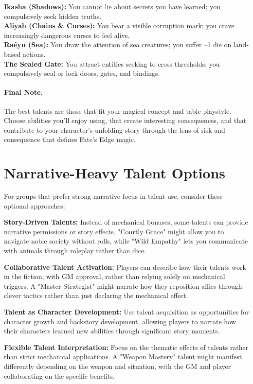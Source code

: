 \begin{tcolorbox}[title=Example Corruptions by Patron]
\textbf{Ikasha (Shadows):} You cannot lie about secrets you have learned; you compulsively seek hidden truths. \\
\textbf{Aliyah (Chains \& Curses):} You bear a visible corruption mark; you crave increasingly dangerous curses to feel alive. \\
\textbf{Raéyn (Sea):} You draw the attention of sea creatures; you suffer --1 die on land-based actions. \\
\textbf{The Sealed Gate:} You attract entities seeking to cross thresholds; you compulsively seal or lock doors, gates, and bindings.
\end{tcolorbox}

\paragraph{Final Note.}
The best talents are those that fit your magical concept and table playstyle. Choose abilities you'll enjoy using, that create interesting consequences, and that contribute to your character's unfolding story through the lens of risk and consequence that defines Fate's Edge magic.

\section{Narrative-Heavy Talent Options}

For groups that prefer strong narrative focus in talent use, consider these optional approaches:

\textbf{Story-Driven Talents:} Instead of mechanical bonuses, some talents can provide narrative permissions or story effects. "Courtly Grace" might allow you to navigate noble society without rolls, while "Wild Empathy" lets you communicate with animals through roleplay rather than dice.

\textbf{Collaborative Talent Activation:} Players can describe how their talents work in the fiction, with GM approval, rather than relying solely on mechanical triggers. A "Master Strategist" might narrate how they reposition allies through clever tactics rather than just declaring the mechanical effect.

\textbf{Talent as Character Development:} Use talent acquisition as opportunities for character growth and backstory development, allowing players to narrate how their characters learned new abilities through significant story moments.

\textbf{Flexible Talent Interpretation:} Focus on the thematic effects of talents rather than strict mechanical applications. A "Weapon Mastery" talent might manifest differently depending on the weapon and situation, with the GM and player collaborating on the specific benefits.
